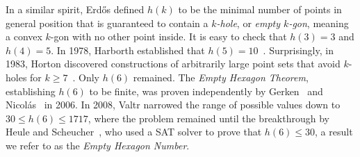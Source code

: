 In a similar spirit,
Erd\H{o}s defined $h(k)$
to be the minimal number of points in general position
that is guaranteed to contain a \emph{$k$-hole},
or \emph{empty $k$-gon},
meaning a convex $k$-gon with no other point inside.
It is easy to check that $h(3) = 3$ and $h(4) = 5$.
In 1978, Harborth established that $h(5) = 10$~\cite{Harborth1978}.
Surprisingly, in 1983, Horton discovered constructions of arbitrarily large point sets that
avoid $k$-holes for $k \geq 7$~\cite{hortonSetsNoEmpty1983}.
Only $h (6)$ remained.
The \emph{Empty Hexagon Theorem},
establishing $h(6)$ to be finite,
was proven independently by Gerken~\cite{gerkenEmptyConvexHexagons2008} and Nicolás~\cite{nicolasEmptyHexagonTheorem2007} in 2006.
In 2008, Valtr narrowed the range of possible values down to $30 \leq h(6) \leq 1717$,
where the problem remained until the breakthrough by Heule and Scheucher~\cite{emptyHexagonNumber},
who used a SAT solver to prove that $h(6) \leq 30$,
a result we refer to as the \emph{Empty Hexagon Number}.
